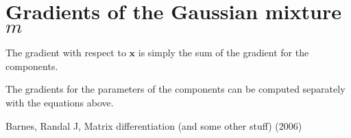 \documentclass{paper}
\newcommand{\vr}[1]{\ensuremath{\boldsymbol{#1}}}
\begin{document}
\section{Gradients of the Gaussian mixture $m$}
The gradient with respect to $\vr{x}$ is simply the sum of the gradient for the components.

The gradients for the parameters of the components can be computed separately with the equations above.


\begin{thebibliography}{9}%
	 Barnes, Randal J,  Matrix differentiation (and some other stuff) (2006)
\end{thebibliography}
\end{document}
